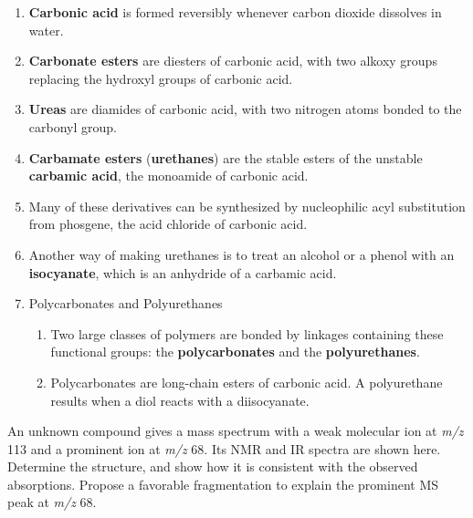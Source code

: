 \begin{enumerate}
    \item \textbf{Carbonic acid} is formed reversibly whenever carbon dioxide dissolves in water.
    \item \textbf{Carbonate esters} are diesters of carbonic acid, with two alkoxy groups replacing the hydroxyl groups of carbonic acid.
    \item \textbf{Ureas} are diamides of carbonic acid, with two nitrogen atoms bonded to the carbonyl group.
    \item \textbf{Carbamate esters} (\textbf{urethanes}) are the stable esters of the unstable \textbf{carbamic acid}, the monoamide of carbonic acid.
    \item Many of these derivatives can be synthesized by nucleophilic acyl substitution from phosgene, the acid chloride of carbonic acid.
    \item Another way of making urethanes is to treat an alcohol or a phenol with an \textbf{isocyanate}, which is an anhydride of a carbamic acid.
    \item Polycarbonates and Polyurethanes
    \begin{enumerate}
        \item Two large classes of polymers are bonded by linkages containing these functional groups: the \textbf{polycarbonates} and the \textbf{polyurethanes}.
        \item Polycarbonates are long-chain esters of carbonic acid. A polyurethane results when a diol reacts with a diisocyanate.
    \end{enumerate}
\end{enumerate}
\chemnameinit{}
\begin{center}
\end{center}

\begin{example} %
    An unknown compound gives a mass spectrum with a weak molecular ion at \textit{m/z} 113 and a prominent ion at \textit{m/z} 68. Its  NMR and IR spectra are shown here. Determine the structure, and show how it is consistent with the observed absorptions. Propose a favorable fragmentation to explain the prominent MS peak at \textit{m/z} 68.

\end{example}

